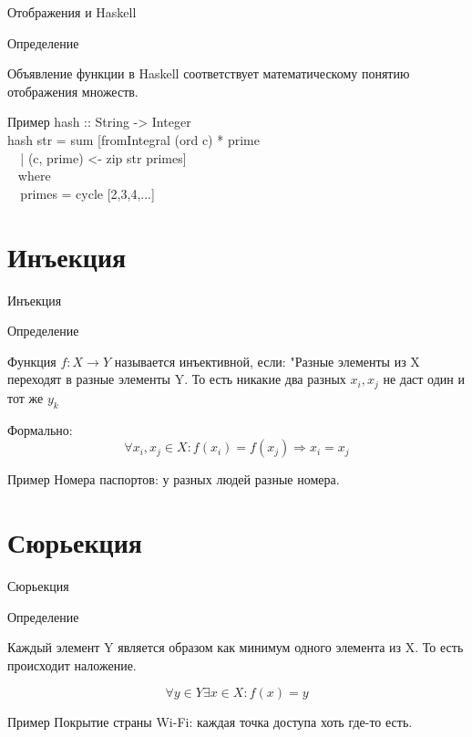 \documentclass{beamer}
\newenvironment{rusdefinition}[1][Определение]{
    \begin{block}{#1}
}{\end{block}}
\newenvironment{rexample}[1][Пример]{\begin{exampleblock}{#1}}{\end{exampleblock}}
\begin{document}
\begin{frame}{Отображения и Haskell}
    \begin{rusdefinition}
        Объявление функции в Haskell соответствует математическому понятию отображения множеств.
    \end{rusdefinition}
    \begin{rexample}
hash :: String -> Integer\\
hash str = sum [fromIntegral (ord c) * prime \\
            \texttt{ }\texttt{ }| (c, prime) <- zip str primes] \\
            \texttt{ } where  \\
            \texttt{ }\texttt{ }primes = cycle [2,3,4,...]\\
    \end{rexample}
\end{frame}

\section{Инъекция}
\begin{frame}{Инъекция}
\begin{rusdefinition}
    Функция $f : X \rightarrow Y $ называется инъективной, если:
    "Разные элементы из X переходят в разные элементы Y.
    То есть никакие два разных $x_i, x_j$ не даст один и тот же $y_k$
\end{rusdefinition}
    Формально: 
    \[ \forall x_i, x_j \in X \colon f(x_i) = f(x_j) \Rightarrow x_i = x_j \]
    \begin{rexample}
    Номера паспортов: у разных людей разные номера.
\end{rexample}
\end{frame}

\section{Сюрьекция}
\begin{frame}{Сюрьекция}
    \begin{rusdefinition}
        Каждый элемент Y является образом как минимум одного элемента из X.
        То есть происходит наложение. 
    \end{rusdefinition}
\[ \forall y \in Y \exists x \in X \colon f(x) = y \]
\begin{rexample}
Покрытие страны Wi-Fi: каждая точка доступа хоть где-то есть.
\end{rexample}
\end{frame}
\end{document}
